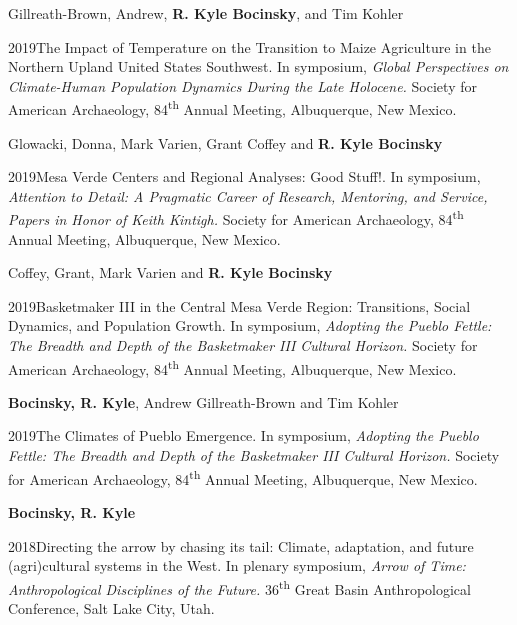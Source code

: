 Gillreath-Brown, Andrew, {\bf R. Kyle Bocinsky}, and Tim Kohler 
\nopagebreak
\begin{list1}
\item[] 2019\hspace{.2cm}The Impact of Temperature on the Transition to Maize Agriculture in the Northern Upland United States Southwest. In symposium, \emph{Global Perspectives on Climate-Human Population Dynamics During the Late Holocene.} Society for American Archaeology, 84\textsuperscript{th} Annual Meeting, Albuquerque, New Mexico.
\end{list1}

Glowacki, Donna, Mark Varien, Grant Coffey and {\bf R. Kyle Bocinsky}
\nopagebreak
\begin{list1}
\item[] 2019\hspace{.2cm}Mesa Verde Centers and Regional Analyses: Good Stuff!. In symposium, \emph{Attention to Detail: A Pragmatic Career of Research, Mentoring, and Service, Papers in Honor of Keith Kintigh.} Society for American Archaeology, 84\textsuperscript{th} Annual Meeting, Albuquerque, New Mexico.
\end{list1}

Coffey, Grant, Mark Varien and {\bf R. Kyle Bocinsky}
\nopagebreak
\begin{list1}
\item[] 2019\hspace{.2cm}Basketmaker III in the Central Mesa Verde Region: Transitions, Social Dynamics, and Population Growth. In symposium, \emph{Adopting the Pueblo Fettle: The Breadth and Depth of the Basketmaker III Cultural Horizon.} Society for American Archaeology, 84\textsuperscript{th} Annual Meeting, Albuquerque, New Mexico.
\end{list1}

\newpage
{\bf Bocinsky, R. Kyle}, Andrew Gillreath-Brown and Tim Kohler
\nopagebreak
\begin{list1}
\item[] 2019\hspace{.2cm}The Climates of Pueblo Emergence. In symposium, \emph{Adopting the Pueblo Fettle: The Breadth and Depth of the Basketmaker III Cultural Horizon.} Society for American Archaeology, 84\textsuperscript{th} Annual Meeting, Albuquerque, New Mexico.
\end{list1}

{\bf Bocinsky, R. Kyle}
\nopagebreak
\begin{list1}
\item[] 2018\hspace{.2cm}Directing the arrow by chasing its tail: Climate, adaptation, and future (agri)cultural systems in the West. In plenary symposium, \emph{Arrow of Time: Anthropological Disciplines of the Future.} 36\textsuperscript{th} Great Basin Anthropological Conference, Salt Lake City, Utah.
\end{list1}

